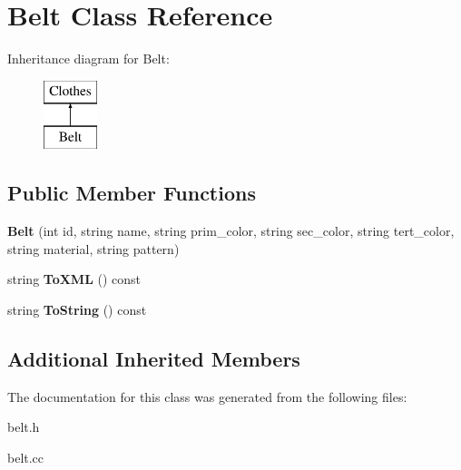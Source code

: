 \hypertarget{classBelt}{}\section{Belt Class Reference}
\label{classBelt}
Inheritance diagram for Belt\+:\begin{figure}[H]
\begin{center}
\leavevmode
\includegraphics[height=2.000000cm]{classBelt}
\end{center}
\end{figure}
\subsection*{Public Member Functions}
\begin{DoxyCompactItemize}
\item 
\mbox{\label{classBelt_a2a8b481a0fe80916513dbd5cf1f03127}} 
{\bfseries Belt} (int id, string name, string prim\+\_\+color, string sec\+\_\+color, string tert\+\_\+color, string material, string pattern)
\item 
\mbox{\label{classBelt_a69b84739e63f35afa5dacf6f3ce0d731}} 
string {\bfseries To\+X\+ML} () const
\item 
\mbox{\label{classBelt_af09e2b5e51b7603ec5dede2e6b0a753f}} 
string {\bfseries To\+String} () const
\end{DoxyCompactItemize}
\subsection*{Additional Inherited Members}


The documentation for this class was generated from the following files\+:\begin{DoxyCompactItemize}
\item 
belt.\+h\item 
belt.\+cc\end{DoxyCompactItemize}
